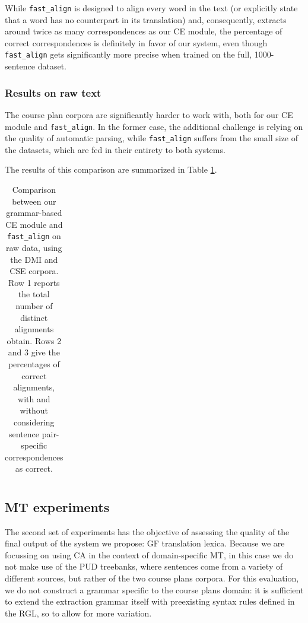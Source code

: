 \documentclass[11pt]{article}
\begin{document}
While \texttt{fast\_align} is designed to align every word in the text (or explicitly state that a word has no counterpart in its translation) and, consequently, extracts around twice as many correspondences as our CE module, the percentage of correct correspondences is definitely in favor of our system, even though \texttt{fast\_align} gets significantly more precise when trained on the full, 1000-sentence dataset. 

\subsubsection{Results on raw text} \label{raw}
The course plan corpora are significantly harder to work with, both for our CE module and \texttt{fast\_align}.
In the former case, the additional challenge is relying on the quality of automatic parsing, while \texttt{fast\_align} suffers from the small size of the datasets, which are fed in their entirety to both systems.

The results of this comparison are summarized in Table \ref{raw_fast}.

\begin{table}[h]
  \centering
  \small
  \begin{tabular}{l|lll}

  \end{tabular}
  \caption[Comparison between our grammar-based CE module and \texttt{fast\_align}]{Comparison between our grammar-based CE module and \texttt{fast\_align} on raw data, using the DMI and CSE corpora. Row 1 reports the total number of distinct alignments obtain. Rows 2 and 3 give the percentages of correct alignments, with and without considering sentence pair-specific correspondences as correct.}
  \label{raw_fast}
 \end{table}


\subsection{MT experiments}
The second set of experiments has the objective of assessing the quality of the final output of the system we propose: GF translation lexica. 
Because we are focussing on using CA in the context of domain-specific MT, in this case we do not make use of the PUD treebanks, where sentences come from a variety of different sources, but rather of the two course plans corpora. 
For this evaluation, we do not construct a grammar specific to the course plans domain: it is sufficient to extend the extraction grammar itself with preexisting syntax rules defined in the RGL, so to allow for more variation. 
\end{document}
